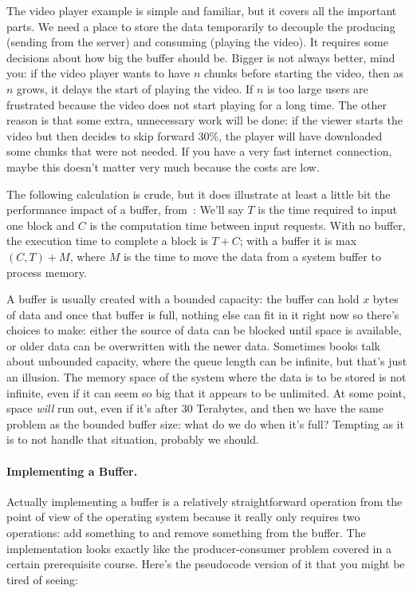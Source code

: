 The video player example is simple and familiar, but it covers all the important parts. We need a place to store the data temporarily to decouple the producing (sending from the server) and consuming (playing the video). It requires some decisions about how big the buffer should be. Bigger is not always better, mind you: if the video player wants to have $n$ chunks before starting the video, then as $n$ grows, it delays the start of playing the video. If $n$ is too large users are frustrated because the video does not start playing for a long time. The other reason is that some extra, unnecessary work will be done: if the viewer starts the video but then decides to skip forward 30\%, the player will have downloaded some chunks that were not needed. If you have a very fast internet connection, maybe this doesn't matter very much because the costs are low.

The following calculation is crude, but it does illustrate at least a little bit the performance impact of a buffer, from~\cite{osi}: We'll say $T$ is the time required to input one block and $C$ is the computation time between input requests. With no buffer, the execution time to complete a block is $T+C$; with a buffer it is max$(C, T) + M$, where $M$ is the time to move the data from a system buffer to process memory.

A buffer is usually created with a bounded capacity: the buffer can hold $x$ bytes of data and once that buffer is full, nothing else can fit in it right now so there's choices to make: either the source of data can be blocked until space is available, or older data can be overwritten with the newer data. Sometimes books talk about unbounded capacity, where the queue length can be infinite, but that's just an illusion. The memory space of the system where the data is to be stored is not infinite, even if it can seem so big that it appears to be unlimited. At some point, space \textit{will} run out, even if it's after 30 Terabytes, and then we have the same problem as the bounded buffer size: what do we do when it's full? Tempting as it is to not handle that situation, probably we should.

\paragraph{Implementing a Buffer.}
Actually implementing a buffer is a relatively straightforward operation from the point of view of the operating system because it really only requires two operations: add something to and remove something from the buffer. The implementation looks exactly like the producer-consumer problem covered in a certain prerequisite course. Here's the pseudocode version of it that you might be tired of seeing:



